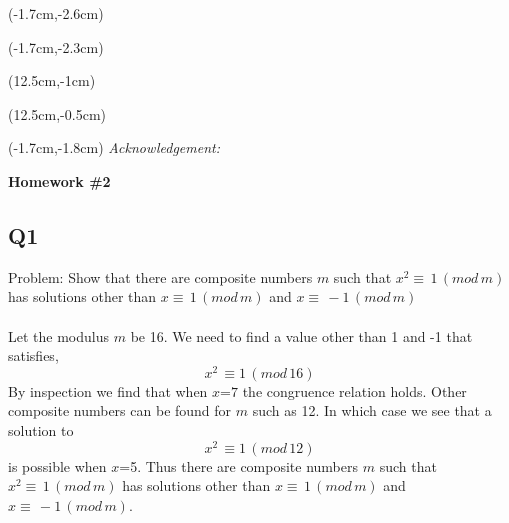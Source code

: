 \documentclass[12pt, oneside]{article}
\begin{document}
\begin{textblock*}{3cm}(-1.7cm,-2.6cm)
\end{textblock*}

\begin{textblock*}{4cm}(-1.7cm,-2.3cm)
\end{textblock*}

\begin{textblock*}{8cm}(12.5cm,-1cm)
\end{textblock*}
\begin{textblock*}{3cm}(12.5cm,-0.5cm)
\end{textblock*}
\begin{textblock*}{13.5cm}(-1.7cm,-1.8cm)
\noindent \textit{\footnotesize Acknowledgement:} 
\end{textblock*}

\vspace{1cm}

\begin{center}
\textbf{\Large Homework \#2}
\end{center}


\subsection*{Q1}
Problem: Show that there are composite numbers $m$ such that $x^{2} \equiv \,1\,(mod\,m)$ has solutions other than $x \equiv\,1\,(mod\,m)$ and $x \equiv\,-1\,(mod\,m)$
\\\\
Let the modulus $m$ be 16. We need to find a value other than 1 and -1 that satisfies,
\[x^{2}\, \equiv 1\,(mod\,16)\]
By inspection we find that when $x$=$7$ the congruence relation holds. Other composite numbers can be found for $m$ such as 12. In which case we see that a solution to
\[x^{2}\, \equiv 1\,(mod\,12)\]
is possible when $x$=5. Thus there are composite numbers $m$ such that $x^{2} \equiv \,1\,(mod\,m)$ has solutions other than $x \equiv\,1\,(mod\,m)$ and $x \equiv\,-1\,(mod\,m)$.
\\
\end{document}
